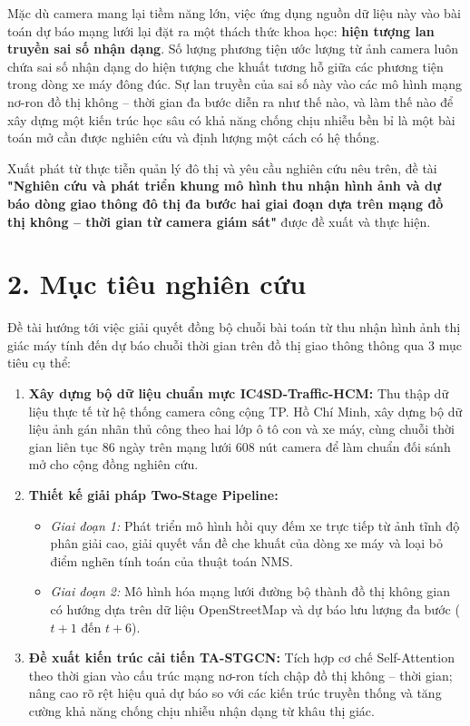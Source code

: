 Mặc dù camera mang lại tiềm năng lớn, việc ứng dụng nguồn dữ liệu này vào bài toán dự báo mạng lưới lại đặt ra một thách thức khoa học: \textbf{hiện tượng lan truyền sai số nhận dạng}. Số lượng phương tiện ước lượng từ ảnh camera luôn chứa sai số nhận dạng do hiện tượng che khuất tương hỗ giữa các phương tiện trong dòng xe máy đông đúc. Sự lan truyền của sai số này vào các mô hình mạng nơ-ron đồ thị không -- thời gian đa bước diễn ra như thế nào, và làm thế nào để xây dựng một kiến trúc học sâu có khả năng chống chịu nhiễu bền bỉ là một bài toán mở cần được nghiên cứu và định lượng một cách có hệ thống.

Xuất phát từ thực tiễn quản lý đô thị và yêu cầu nghiên cứu nêu trên, đề tài \textbf{"Nghiên cứu và phát triển khung mô hình thu nhận hình ảnh và dự báo dòng giao thông đô thị đa bước hai giai đoạn dựa trên mạng đồ thị không -- thời gian từ camera giám sát"} được đề xuất và thực hiện.

\section*{2. Mục tiêu nghiên cứu}
Đề tài hướng tới việc giải quyết đồng bộ chuỗi bài toán từ thu nhận hình ảnh thị giác máy tính đến dự báo chuỗi thời gian trên đồ thị giao thông thông qua 3 mục tiêu cụ thể:
\begin{enumerate}
    \item \textbf{Xây dựng bộ dữ liệu chuẩn mực IC4SD-Traffic-HCM:} Thu thập dữ liệu thực tế từ hệ thống camera công cộng TP. Hồ Chí Minh, xây dựng bộ dữ liệu ảnh gán nhãn thủ công theo hai lớp ô tô con và xe máy, cùng chuỗi thời gian liên tục 86 ngày trên mạng lưới 608 nút camera để làm chuẩn đối sánh mở cho cộng đồng nghiên cứu.
    \item \textbf{Thiết kế giải pháp Two-Stage Pipeline:} 
    \begin{itemize}
        \item \textit{Giai đoạn 1:} Phát triển mô hình hồi quy đếm xe trực tiếp từ ảnh tĩnh độ phân giải cao, giải quyết vấn đề che khuất của dòng xe máy và loại bỏ điểm nghẽn tính toán của thuật toán NMS.
        \item \textit{Giai đoạn 2:} Mô hình hóa mạng lưới đường bộ thành đồ thị không gian có hướng dựa trên dữ liệu OpenStreetMap và dự báo lưu lượng đa bước ($t+1$ đến $t+6$).
    \end{itemize}
    \item \textbf{Đề xuất kiến trúc cải tiến TA-STGCN:} Tích hợp cơ chế Self-Attention theo thời gian vào cấu trúc mạng nơ-ron tích chập đồ thị không -- thời gian; nâng cao rõ rệt hiệu quả dự báo so với các kiến trúc truyền thống và tăng cường khả năng chống chịu nhiễu nhận dạng từ khâu thị giác.

\end{enumerate}

